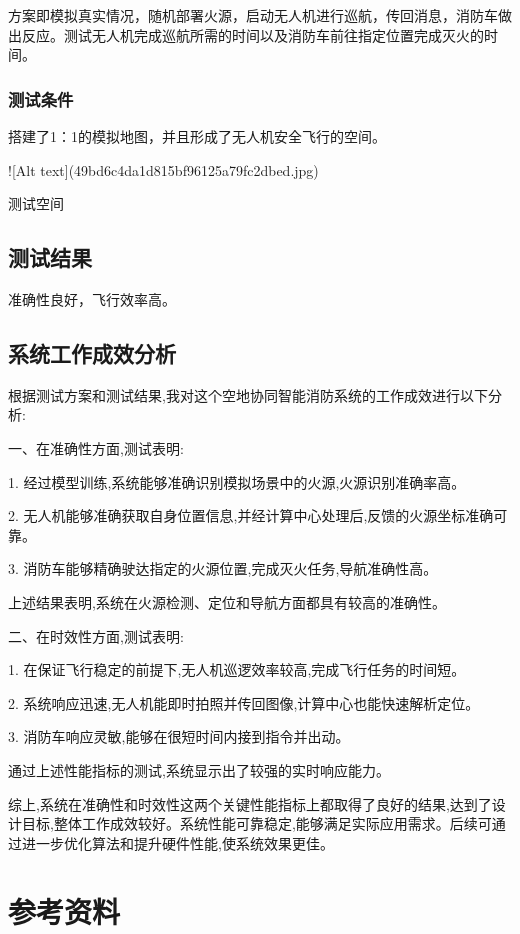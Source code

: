 \documentclass[12pt, a4paper, oneside]{article}
\begin{document}
方案即模拟真实情况，随机部署火源，启动无人机进行巡航，传回消息，消防车做出反应。测试无人机完成巡航所需的时间以及消防车前往指定位置完成灭火的时间。

\subsubsection{测试条件}

搭建了1：1的模拟地图，并且形成了无人机安全飞行的空间。

![Alt text](49bd6c4da1d815bf96125a79fc2dbed.jpg)

测试空间

\subsection{测试结果}

准确性良好，飞行效率高。

\subsection{系统工作成效分析}

根据测试方案和测试结果,我对这个空地协同智能消防系统的工作成效进行以下分析:

一、在准确性方面,测试表明:

1. 经过模型训练,系统能够准确识别模拟场景中的火源,火源识别准确率高。

2. 无人机能够准确获取自身位置信息,并经计算中心处理后,反馈的火源坐标准确可靠。

3. 消防车能够精确驶达指定的火源位置,完成灭火任务,导航准确性高。

上述结果表明,系统在火源检测、定位和导航方面都具有较高的准确性。

二、在时效性方面,测试表明:

1. 在保证飞行稳定的前提下,无人机巡逻效率较高,完成飞行任务的时间短。

2. 系统响应迅速,无人机能即时拍照并传回图像,计算中心也能快速解析定位。

3. 消防车响应灵敏,能够在很短时间内接到指令并出动。

通过上述性能指标的测试,系统显示出了较强的实时响应能力。

综上,系统在准确性和时效性这两个关键性能指标上都取得了良好的结果,达到了设计目标,整体工作成效较好。系统性能可靠稳定,能够满足实际应用需求。后续可通过进一步优化算法和提升硬件性能,使系统效果更佳。

\section{参考资料}
\end{document}
